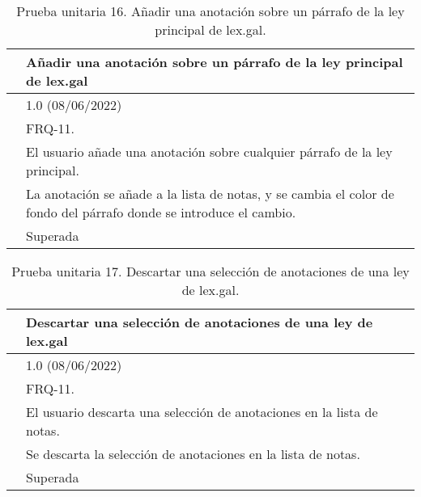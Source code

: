 \begin{table}[H]
\begin{center}
\begin{tabular}{|p{3cm}|p{10cm}|} \hline
\centering {\bf PU-16} & Añadir una anotación sobre un párrafo de la ley principal de lex.gal  \\ \hline\hline
\centering {\bf Versión} & 1.0 (08/06/2022) \\ \hline
\centering {\bf Dependencias} & FRQ-11. \\ \hline
\centering {\bf Descripción} &  El usuario añade una anotación sobre cualquier párrafo de la ley principal. \\ \hline
\centering {\bf Criterio de aceptación} & La anotación se añade a la lista de notas, y se cambia el color de fondo del párrafo donde se introduce el cambio. \\ \hline
\centering {\bf Estado} & Superada \\ \hline
\end{tabular}
\caption{Prueba unitaria 16. Añadir una anotación sobre un párrafo de la ley principal de lex.gal.}
\label{enlacePU16}
\end{center}
\end{table}

\begin{table}[H]
\begin{center}
\begin{tabular}{|p{3cm}|p{10cm}|} \hline
\centering {\bf PU-17} & Descartar una selección de anotaciones de una ley de lex.gal  \\ \hline\hline
\centering {\bf Versión} & 1.0 (08/06/2022) \\ \hline
\centering {\bf Dependencias} & FRQ-11. \\ \hline
\centering {\bf Descripción} &  El usuario descarta una selección de anotaciones en la lista de notas. \\ \hline
\centering {\bf Criterio de aceptación} & Se descarta la selección de anotaciones en la lista de notas. \\ \hline
\centering {\bf Estado} & Superada \\ \hline
\end{tabular}
\caption{Prueba unitaria 17. Descartar una selección de anotaciones de una ley de lex.gal.}
\label{enlacePU17}
\end{center}
\end{table}

